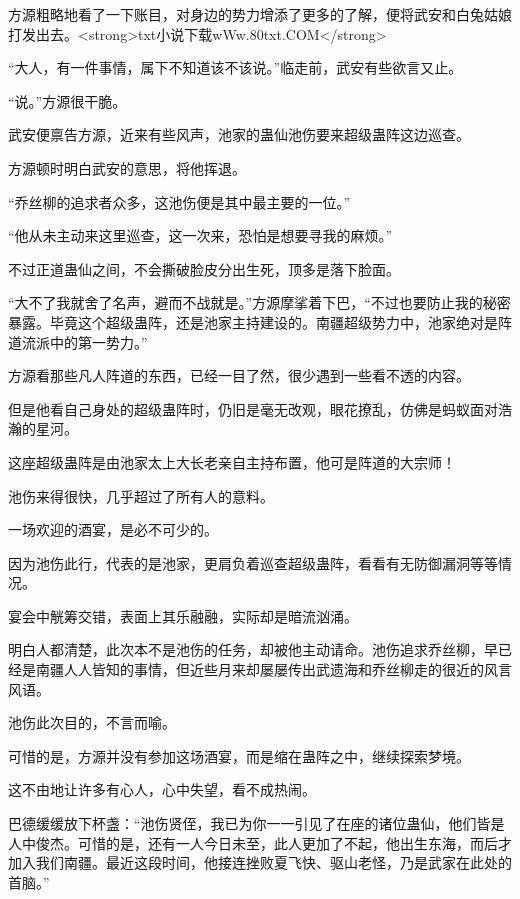 
\begin{this_body}

方源粗略地看了一下账目，对身边的势力增添了更多的了解，便将武安和白兔姑娘打发出去。<strong>txt小说下载wWw.80txt.COM</strong>

“大人，有一件事情，属下不知道该不该说。”临走前，武安有些欲言又止。

“说。”方源很干脆。

武安便禀告方源，近来有些风声，池家的蛊仙池伤要来超级蛊阵这边巡查。

方源顿时明白武安的意思，将他挥退。

“乔丝柳的追求者众多，这池伤便是其中最主要的一位。”

“他从未主动来这里巡查，这一次来，恐怕是想要寻我的麻烦。”

不过正道蛊仙之间，不会撕破脸皮分出生死，顶多是落下脸面。

“大不了我就舍了名声，避而不战就是。”方源摩挲着下巴，“不过也要防止我的秘密暴露。毕竟这个超级蛊阵，还是池家主持建设的。南疆超级势力中，池家绝对是阵道流派中的第一势力。”

方源看那些凡人阵道的东西，已经一目了然，很少遇到一些看不透的内容。

但是他看自己身处的超级蛊阵时，仍旧是毫无改观，眼花撩乱，仿佛是蚂蚁面对浩瀚的星河。

这座超级蛊阵是由池家太上大长老亲自主持布置，他可是阵道的大宗师！

池伤来得很快，几乎超过了所有人的意料。

一场欢迎的酒宴，是必不可少的。

因为池伤此行，代表的是池家，更肩负着巡查超级蛊阵，看看有无防御漏洞等等情况。

宴会中觥筹交错，表面上其乐融融，实际却是暗流汹涌。

明白人都清楚，此次本不是池伤的任务，却被他主动请命。池伤追求乔丝柳，早已经是南疆人人皆知的事情，但近些月来却屡屡传出武遗海和乔丝柳走的很近的风言风语。

池伤此次目的，不言而喻。

可惜的是，方源并没有参加这场酒宴，而是缩在蛊阵之中，继续探索梦境。

这不由地让许多有心人，心中失望，看不成热闹。

巴德缓缓放下杯盏：“池伤贤侄，我已为你一一引见了在座的诸位蛊仙，他们皆是人中俊杰。可惜的是，还有一人今日未至，此人更加了不起，他出生东海，而后才加入我们南疆。最近这段时间，他接连挫败夏飞快、驱山老怪，乃是武家在此处的首脑。”


\end{this_body}
